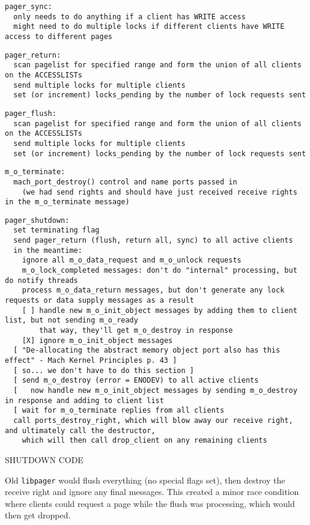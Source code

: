 \documentclass{article}
\def\libpager{{\tt libpager}\xspace}
\begin{document}
\begin{verbatim}
pager_sync:
  only needs to do anything if a client has WRITE access
  might need to do multiple locks if different clients have WRITE access to different pages
\end{verbatim}

\begin{verbatim}
pager_return:
  scan pagelist for specified range and form the union of all clients on the ACCESSLISTs
  send multiple locks for multiple clients
  set (or increment) locks_pending by the number of lock requests sent
\end{verbatim}

\begin{verbatim}
pager_flush:
  scan pagelist for specified range and form the union of all clients on the ACCESSLISTs
  send multiple locks for multiple clients
  set (or increment) locks_pending by the number of lock requests sent
\end{verbatim}

\begin{verbatim}
m_o_terminate:
  mach_port_destroy() control and name ports passed in
    (we had send rights and should have just received receive rights in the m_o_terminate message)
\end{verbatim}

\begin{verbatim}
pager_shutdown:
  set terminating flag
  send pager_return (flush, return all, sync) to all active clients
  in the meantime:
    ignore all m_o_data_request and m_o_unlock requests
    m_o_lock_completed messages: don't do "internal" processing, but do notify threads
    process m_o_data_return messages, but don't generate any lock requests or data supply messages as a result
    [ ] handle new m_o_init_object messages by adding them to client list, but not sending m_o_ready
        that way, they'll get m_o_destroy in response
    [X] ignore m_o_init_object messages
  [ "De-allocating the abstract memory object port also has this effect" - Mach Kernel Principles p. 43 ]
  [ so... we don't have to do this section ]
  [ send m_o_destroy (error = ENODEV) to all active clients
  [   now handle new m_o_init_object messages by sending m_o_destroy in response and adding to client list
  [ wait for m_o_terminate replies from all clients
  call ports_destroy_right, which will blow away our receive right, and ultimately call the destructor,
    which will then call drop_client on any remaining clients
\end{verbatim}

SHUTDOWN CODE

Old \libpager would flush everything (no special flags set), then
destroy the receive right and ignore any final messages.  This created
a minor race condition where clients could request a page while the
flush was processing, which would then get dropped.
\end{document}
